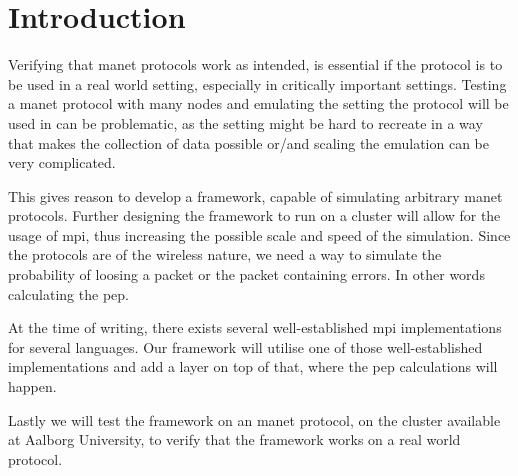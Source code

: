 \chapter{Introduction}
Verifying that \gls{manet} protocols work as intended, is essential if the protocol is to be used in a real world setting, especially in critically important settings. Testing a \gls{manet} protocol with many nodes and emulating the setting the protocol will be used in can be problematic, as the setting might be hard to recreate in a way that makes the collection of data possible or/and scaling the emulation can be very complicated.\medbreak


This gives reason to develop a framework, capable of simulating arbitrary \gls{manet} protocols. Further designing the framework to run on a cluster will allow for the usage of \gls{mpi}, thus increasing the possible scale and speed of the simulation.
Since the protocols are of the wireless nature, we need a way to simulate the probability of loosing a packet or the packet containing errors. In other words calculating the \gls{pep}.

At the time of writing, there exists several well-established \gls{mpi} implementations for several languages. Our framework will utilise one of those well-established implementations and add a layer on top of that, where the \gls{pep} calculations will happen.

Lastly we will test the framework on an \gls{manet} protocol, on the cluster available at Aalborg University, to verify that the framework works on a real world protocol.